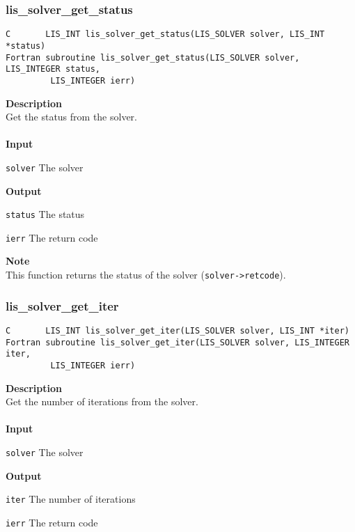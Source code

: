 \documentclass[a4paper]{article}
\newcommand{\namelistlabel}[1]{\mbox{#1}\hfill}
\newenvironment{namelist}[1]{%
\begin{list}{}
  {\let\makelabel\namelistlabel
  \settowidth{\labelwidth}{#1}
  \setlength{\leftmargin}{1.1\labelwidth}}
  }{%
\end{list}}
\begin{document}
\subsubsection{lis\_solver\_get\_status}
\begin{screen}
\verb|C       LIS_INT lis_solver_get_status(LIS_SOLVER solver, LIS_INT *status)|\\
\verb|Fortran subroutine lis_solver_get_status(LIS_SOLVER solver, LIS_INTEGER status,|\\
\verb|         LIS_INTEGER ierr)|
\end{screen}
{\bf Description}\\
\indent
Get the status from the solver.
\\ \\
\noindent
{\bf Input}
\begin{namelist}{XXXXXXXXXXXXXXXXXXXX}
\item[\tt solver] The solver
\end{namelist}
{\bf Output}
\begin{namelist}{XXXXXXXXXXXXXXXXXXXX}
\item[\tt status] The status
\item[\tt ierr] The return code
\end{namelist}
{\bf Note}\\
\indent
This function returns the status of the solver ({\tt solver->retcode}).

\subsubsection{lis\_solver\_get\_iter}
\begin{screen}
\verb|C       LIS_INT lis_solver_get_iter(LIS_SOLVER solver, LIS_INT *iter)|\\
\verb|Fortran subroutine lis_solver_get_iter(LIS_SOLVER solver, LIS_INTEGER iter,|\\
\verb|         LIS_INTEGER ierr)|
\end{screen}
{\bf Description}\\
\indent
Get the number of iterations from the solver.
\\ \\
\noindent
{\bf Input}
\begin{namelist}{XXXXXXXXXXXXXXXXXXXX}
\item[\tt solver] The solver
\end{namelist}
{\bf Output}
\begin{namelist}{XXXXXXXXXXXXXXXXXXXX}
\item[\tt iter] The number of iterations
\item[\tt ierr] The return code
\end{namelist}
\end{document}
